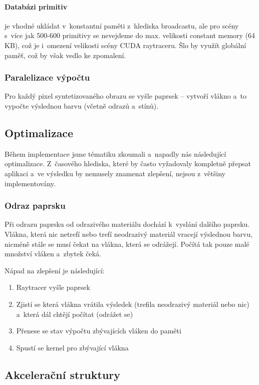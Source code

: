 \documentclass[12pt,a4paper,titlepage,final]{report}
\begin{document}
\paragraph{Databázi primitiv} je vhodné ukládat v~konstantní paměti z~hlediska broadcastu, ale pro scény s~více jak 500-600 primitivy se nevejdeme do max. velikosti constant memory (64 KB), což je i~omezení velikosti scény CUDA raytraceru. Šlo by využít globální paměť, což by však vedlo ke zpomalení.

\subsubsection{Paralelizace výpočtu}

Pro každý pixel syntetizovaného obrazu se vyšle paprsek -- vytvoří vlákno a~to vypočte výslednou barvu (včetně odrazů a~stínů).

\subsection{Optimalizace}

Během implementace jsme tématiku zkoumali a~napadly nás následující optimalizace. Z~časového hlediska, které by často vyžadovaly kompletně přepsat aplikaci a~ve výsledku by nemusely znamenat zlepšení, nejsou z~většiny implementovány.

\subsubsection{Odraz paprsku} 

Při odrazu paprsku od odrazivého materiálu dochází k~vyslání dalšího paprsku. Vlákna, která nic netrefí nebo trefí neodrazivý materiál vracejí výslednou barvu, nicméně stále se musí čekat na vlákna, která se odrážejí. Počítá tak pouze malé množství vláken a~zbytek čeká. 

Nápad na zlepšení je následující:
\begin{enumerate}
	\item Raytracer vyšle paprsek
	\item Zjistí se která vlákna vrátila výsledek (trefila neodrazivý materiál nebo nic) a~která dál chtějí počítat (odrážet se)
	\item Přenese se stav výpočtu zbývajících vláken do paměti
	\item Spustí se kernel pro zbývající vlákna 
\end{enumerate}

\subsection{Akcelerační struktury}
\end{document}
